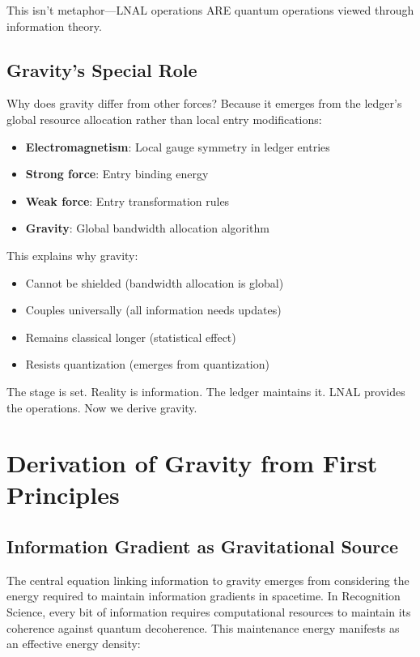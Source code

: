 \documentclass[12pt,letterpaper]{article}
\begin{document}
This isn't metaphor---LNAL operations ARE quantum operations viewed through information theory.

\subsection{Gravity's Special Role}

Why does gravity differ from other forces? Because it emerges from the ledger's global resource allocation rather than local entry modifications:

\begin{itemize}
\item \textbf{Electromagnetism}: Local gauge symmetry in ledger entries
\item \textbf{Strong force}: Entry binding energy
\item \textbf{Weak force}: Entry transformation rules
\item \textbf{Gravity}: Global bandwidth allocation algorithm
\end{itemize}

This explains why gravity:
\begin{itemize}
\item Cannot be shielded (bandwidth allocation is global)
\item Couples universally (all information needs updates)
\item Remains classical longer (statistical effect)
\item Resists quantization (emerges from quantization)
\end{itemize}

The stage is set. Reality is information. The ledger maintains it. LNAL provides the operations. Now we derive gravity.

\section{Derivation of Gravity from First Principles}
\label{sec:derivation}

\subsection{Information Gradient as Gravitational Source}

The central equation linking information to gravity emerges from considering the energy required to maintain information gradients in spacetime. In Recognition Science, every bit of information requires computational resources to maintain its coherence against quantum decoherence. This maintenance energy manifests as an effective energy density:
\end{document}
